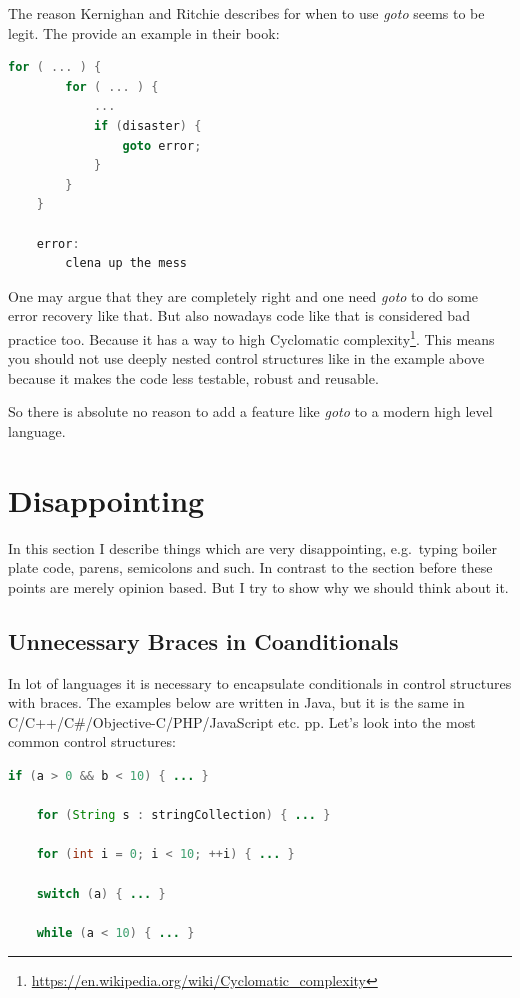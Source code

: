 \documentclass[11pt, a4paper]{report}
\begin{document}
The reason Kernighan and Ritchie describes for when to use \textit{goto} seems to be legit. The provide an example in their book\cite{c-programming-lang}:

\begin{lstlisting}[language=C]
    for ( ... ) {
        for ( ... ) {
            ...
            if (disaster) {
                goto error;
            }
        }
    }
    
    error:
        clena up the mess
\end{lstlisting}

One may argue that they are completely right and one need \textit{goto} to do some error recovery like that. But also nowadays code like that is considered bad practice too. Because it has a way to high Cyclomatic complexity\footnote{\url{https://en.wikipedia.org/wiki/Cyclomatic_complexity}}. This means you should not use deeply nested control structures like in the example above because it makes the code less testable, robust and reusable.

So there is absolute no reason to add a feature like \textit{goto} to a modern high level language.

\section{Disappointing}

In this section I describe things which are very disappointing, e.g.\ typing boiler plate code, parens, semicolons and such. In contrast to the section before these points are merely opinion based. But I try to show why we should think about it.

\subsection{Unnecessary Braces in Coanditionals}

In lot of languages it is necessary to encapsulate conditionals in control structures with braces. The examples below are written in Java, but it is the same in C/C++/C\#/Objective-C/PHP/JavaScript etc. pp. Let's look into the most common control structures:

\begin{lstlisting}[language=Java]
    if (a > 0 && b < 10) { ... }
    
    for (String s : stringCollection) { ... }
    
    for (int i = 0; i < 10; ++i) { ... }
    
    switch (a) { ... }
    
    while (a < 10) { ... }
\end{lstlisting}
\end{document}
